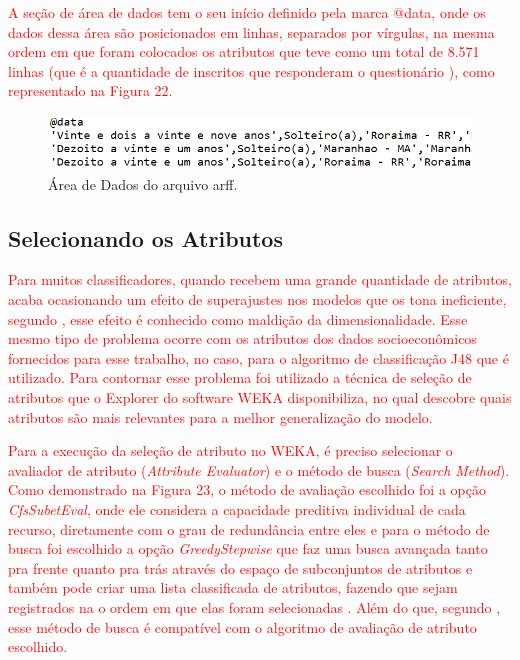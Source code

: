 \par
\textcolor{red}{A seção de área de dados tem o seu início definido pela marca @data, onde os dados dessa área são posicionados em linhas, separados por vírgulas, na mesma ordem em que foram colocados os atributos que teve como um total de 8.571 linhas (que é a quantidade de inscritos que responderam o questionário ), como representado na Figura 22.}

\par
\begin{figure}[!htp]
	\begin{center}
    \caption{\label{fig:waveform_fig} Área de Dados do arquivo arff.}
	\includegraphics[scale=0.60]{Figuras/arquivo_arff_2.png}
	\end{center}
\end{figure}


\subsection{Selecionando os Atributos}

\par
\textcolor{red}{Para muitos classificadores, quando recebem uma grande quantidade de atributos, acaba ocasionando um efeito de superajustes nos modelos que os tona ineficiente, segundo , esse efeito é conhecido como maldição da dimensionalidade. Esse mesmo tipo de problema ocorre com os atributos dos dados socioeconômicos fornecidos para esse trabalho, no caso, para o algoritmo de classificação J48 que é utilizado. Para contornar esse problema foi utilizado a técnica de seleção de atributos que o Explorer do software WEKA disponibiliza, no qual descobre quais atributos são mais relevantes para a melhor generalização do modelo.}

\par
\textcolor{red}{Para a execução da seleção de atributo no WEKA, é preciso selecionar o avaliador de atributo (\textit{Attribute Evaluator}) e o método de busca (\textit{Search Method}). Como demonstrado na Figura 23, o método de avaliação escolhido foi a opção \textit{CfsSubetEval}, onde ele considera a capacidade preditiva individual de cada recurso, diretamente com o grau de redundância entre eles e para o método de busca foi escolhido a opção \textit{GreedyStepwise} que faz uma busca avançada tanto pra frente quanto pra trás através do espaço de subconjuntos de atributos e também pode criar uma lista classificada de atributos, fazendo que sejam registrados na o ordem em que elas foram selecionadas \cite{WEKA}. Além do que, segundo , esse método de busca é compatível com o algoritmo de avaliação de atributo escolhido. }

